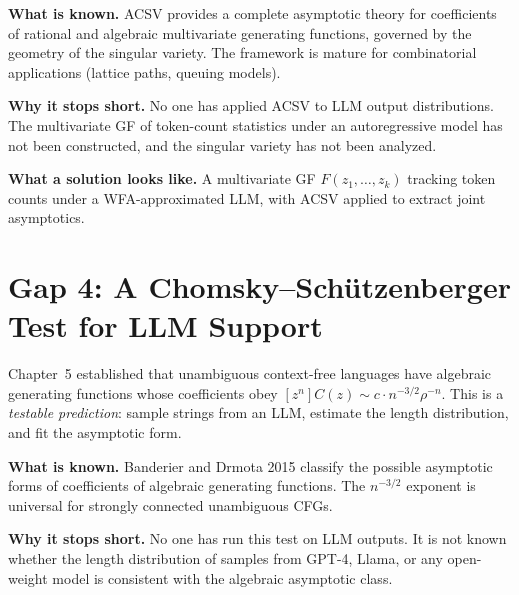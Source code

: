 \textbf{What is known.} ACSV provides a complete asymptotic theory for coefficients of rational and algebraic multivariate generating functions, governed by the geometry of the singular variety. The framework is mature for combinatorial applications (lattice paths, queuing models).

\textbf{Why it stops short.} No one has applied ACSV to LLM output distributions. The multivariate GF of token-count statistics under an autoregressive model has not been constructed, and the singular variety has not been analyzed.

\textbf{What a solution looks like.} A multivariate GF $F(z_1,\ldots,z_k)$ tracking token counts under a WFA-approximated LLM, with ACSV applied to extract joint asymptotics.

\section{Gap 4: A Chomsky--Sch\"utzenberger Test for LLM Support}
\label{ch18:gap4}

Chapter~5 established that unambiguous context-free languages have algebraic generating functions whose coefficients obey $[z^n]C(z)\sim c\cdot n^{-3/2}\rho^{-n}$. This is a \emph{testable prediction}: sample strings from an LLM, estimate the length distribution, and fit the asymptotic form.

\textbf{What is known.} Banderier and Drmota 2015 \cite{BanderierDrmota2015} classify the possible asymptotic forms of coefficients of algebraic generating functions. The $n^{-3/2}$ exponent is universal for strongly connected unambiguous CFGs.

\textbf{Why it stops short.} No one has run this test on LLM outputs. It is not known whether the length distribution of samples from GPT-4, Llama, or any open-weight model is consistent with the algebraic asymptotic class.

